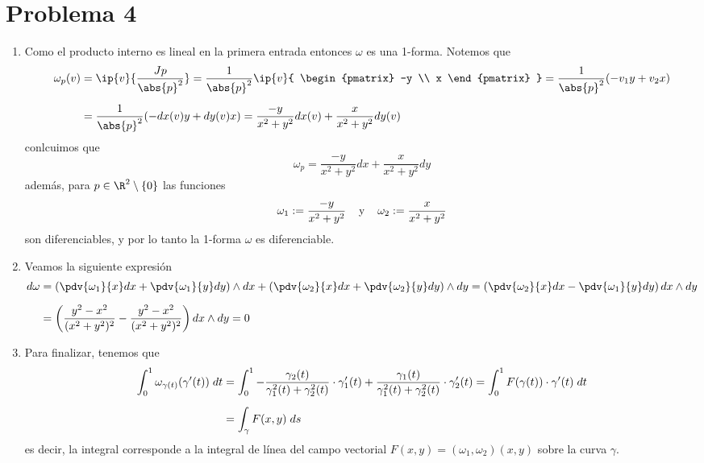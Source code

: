 \documentclass{article}
\begin{document}
\section*{Problema 4}
\begin{enumerate}
    \item Como el producto interno es lineal en la primera entrada entonces $\omega$ es una 
    1-forma. Notemos que
    \begin{align*}
        \omega_{p}(v) &= \ip{v}{\frac{Jp}{\abs{p}^{2}}}=\frac{1}{\abs{p}^{2}}\ip{v}{
            \begin{pmatrix}
                -y \\
                x
            \end{pmatrix}
            }=\frac{1}{\abs{p}^{2}}(-v_{1}y+v_{2}x) \\[2mm]
        &= \frac{1}{\abs{p}^{2}}(-dx(v)y+dy(v)x)=\frac{-y}{x^{2}+y^{2}}dx(v)
        +\frac{x}{x^{2}+y^{2}}dy(v)
    \end{align*}
    conlcuimos que
    \begin{equation*}
        \omega_{p}=\frac{-y}{x^{2}+y^{2}}dx+\frac{x}{x^{2}+y^{2}}dy
    \end{equation*}
    además, para $p\in\R^{2}\setminus\{0\}$ las funciones
    \begin{equation*}
        \omega_{1}:=\frac{-y}{x^{2}+y^{2}}\hspace{4mm}\text{y}
        \hspace{4mm}\omega_{2}:=\frac{x}{x^{2}+y^{2}}
    \end{equation*}
    son diferenciables, y por lo tanto la 1-forma $\omega$ es diferenciable.
    
    \item Veamos la siguiente expresión
    \begin{align*}
        d\omega &= \left(\pdv{\omega_{1}}{x}dx+\pdv{\omega_{1}}{y}dy\right)\land dx
        +\left(\pdv{\omega_{2}}{x}dx+\pdv{\omega_{2}}{y}dy\right)\land dy
        =\left(\pdv{\omega_{2}}{x}dx-\pdv{\omega_{1}}{y}dy\right)dx\land dy \\[2mm]
        &= \left(\frac{y^{2}-x^{2}}{(x^{2}+y^{2})^{2}}
        -\frac{y^{2}-x^{2}}{(x^{2}+y^{2})^{2}}\right)dx\land dy=0
    \end{align*}
    
    \item Para finalizar, tenemos que
    \begin{align*}
        \int_{0}^{1}\omega_{\gamma(t)}(\gamma'(t))\hspace{1mm}dt &= \int_{0}^{1}
        -\frac{\gamma_{2}(t)}{\gamma_{1}^{2}(t)+\gamma_{2}^{2}(t)}\cdot\gamma_{1}'(t)
        +\frac{\gamma_{1}(t)}{\gamma_{1}^{2}(t)+\gamma_{2}^{2}(t)}\cdot\gamma_{2}'(t)
        =\int_{0}^{1}F(\gamma(t))\cdot\gamma'(t)\hspace{1mm}dt \\[2mm]
        &= \int_{\gamma}F(x,y)\hspace{1mm}ds
    \end{align*}
    es decir, la integral corresponde a la integral de línea del campo vectorial 
    $F(x,y)=(\omega_{1},\omega_{2})(x,y)$ sobre la curva $\gamma$.
\end{enumerate}
\end{document}
